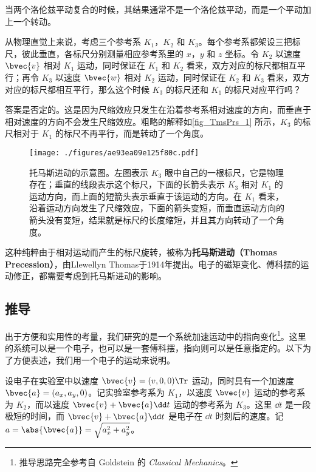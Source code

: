

当两个洛伦兹平动复合的时候，其结果通常不是一个洛伦兹平动，而是一个平动加上一个转动。

从物理直觉上来说，考虑三个参考系 $K_1$，$K_2$ 和 $K_3$。每个参考系都架设三把标尺，彼此垂直，各标尺分别测量相应参考系里的 $x$，$y$ 和 $z$ 坐标。令 $K_2$ 以速度 $\bvec{v}$ 相对 $K_1$ 运动，同时保证在 $K_1$ 和 $K_2$ 看来，双方对应的标尺都相互平行；再令 $K_3$ 以速度 $\bvec{w}$ 相对 $K_2$ 运动，同时保证在 $K_2$ 和 $K_3$ 看来，双方对应的标尺都相互平行，那么这个时候 $K_3$ 的标尺还和 $K_1$ 的标尺对应平行吗？

答案是否定的。这是因为尺缩效应只发生在沿着参考系相对速度的方向，而垂直于相对速度的方向不会发生尺缩效应。粗略的解释如\autoref{fig_TmsPrs_1} 所示，$K_3$ 的标尺相对于 $K_1$ 的标尺不再平行，而是转动了一个角度。

\begin{figure}[ht]
\centering
\texttt{[image: ./figures/ae93ea09e125f80c.pdf]}
\caption{托马斯进动的示意图。左图表示 $K_3$ 眼中自己的一根标尺，它是物理存在；垂直的线段表示这个标尺，下面的长箭头表示 $K_3$ 相对 $K_1$ 的运动方向，而上面的短箭头表示垂直于该运动的方向。在 $K_1$ 看来，沿着运动方向发生了尺缩效应，下面的箭头变短，而垂直运动方向的箭头没有变短，结果就是标尺的长度缩短，并且其方向转动了一个角度。} \label{fig_TmsPrs_1}
\end{figure}

这种纯粹由于相对运动而产生的标尺旋转，被称为\textbf{托马斯进动（Thomas Precession）}，由Llewellyn Thomas于1914年提出。电子的磁矩变化、傅科摆的运动修正，都需要考虑到托马斯进动的影响。

\subsection{推导}

出于方便和实用性的考量，我们研究的是一个系统加速运动中的指向变化\footnote{推导思路完全参考自 Goldstein 的 \textsl{Classical Mechanics}\cite{Goldstein}。}。这里的系统可以是一个电子，也可以是一套傅科摆，指向则可以是任意指定的。以下为了方便表述，我们用一个电子的运动来说明。

设电子在实验室中以速度 $\bvec{v}=(v, 0, 0)\Tr$ 运动，同时具有一个加速度 $\bvec{a}=(a_x, a_y, 0)$。记实验室参考系为 $K_1$，以速度 $\bvec{v}$ 运动的参考系为 $K_2$，而以速度 $\bvec{v}+\bvec{a}\dd t$ 运动的参考系为 $K_3$。这里 $\dd t$ 是一段极短的时间，而 $\bvec{v}+\bvec{a}\dd t$ 是电子在 $\dd t$ 时刻后的速度。记 $a=\abs{\bvec{a}}=\sqrt{a_x^2+a_y^2}$。

